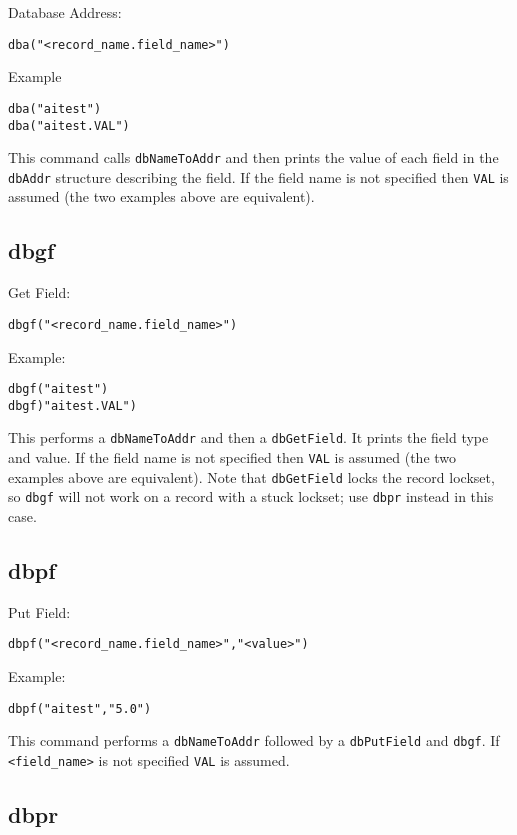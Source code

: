 Database Address:

\begin{verbatim}dba("<record_name.field_name>")
\end{verbatim}Example

\begin{verbatim}dba("aitest")
dba("aitest.VAL")
\end{verbatim}This command calls \verb|dbNameToAddr| and then prints the value of each field in the \verb|dbAddr| structure describing the field. 
If the field name is not specified then \verb|VAL| is assumed (the two examples above are equivalent).

\subsection{dbgf}

Get Field:

\begin{verbatim}dbgf("<record_name.field_name>")
\end{verbatim}Example:

\begin{verbatim}dbgf("aitest")
dbgf)"aitest.VAL")
\end{verbatim}This performs a \verb|dbNameToAddr| and then a \verb|dbGetField|. It prints the field type and value. If the field name is not 
specified then \verb|VAL| is assumed (the two examples above are equivalent). Note that \verb|dbGetField| locks the record lockset, 
so \verb|dbgf| will not work on a record with a stuck lockset; use \verb|dbpr| instead in this case.

\subsection{dbpf}

Put Field:

\begin{verbatim}dbpf("<record_name.field_name>","<value>")
\end{verbatim}Example:

\begin{verbatim}dbpf("aitest","5.0")
\end{verbatim}This command performs a \verb|dbNameToAddr| followed by a \verb|dbPutField| and \verb|dbgf|. If \verb|<field_name>| is not specified 
\verb|VAL| is assumed. 

\subsection{dbpr}

